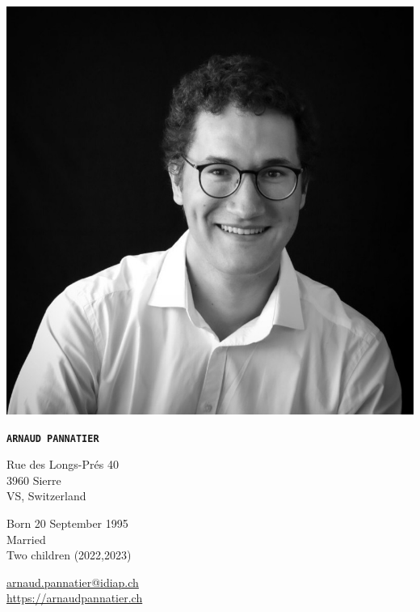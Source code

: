 \documentclass{article}
\begin{document}
\noindent
\begin{minipage}{0.3\textwidth}
  \includegraphics[width=\textwidth]{arnaud-cv}
\end{minipage}
\hfill
\begin{minipage}{0.6\textwidth}
  \noindent
  \centering
  \Huge \bfseries \texttt{ARNAUD PANNATIER}
  \vspace{4mm}

  \begin{minipage}{0.4\textwidth}
    \small \normalfont \noindent
    Rue des Longs-Prés 40 \\
    3960 Sierre \\
    VS, Switzerland \\
  \end{minipage}
  \hfill
  \begin{minipage}{0.4\textwidth}
    \small \normalfont
    \noindent Born 20 September 1995 \\
    Married \\
    Two children (2022,2023) \\
  \end{minipage}

  \small \normalfont \noindent
  \href{mailto:arnaud.pannatier@idiap.ch}{arnaud.pannatier@idiap.ch}\\
  \href{https://arnaudpannatier.ch}{https://arnaudpannatier.ch}\\
\end{minipage}
\end{document}
